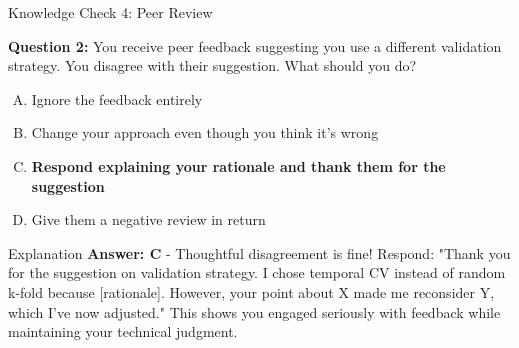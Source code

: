 \begin{frame}{Knowledge Check 4: Peer Review}
\vspace{0.2cm}

\textbf{Question 2:} You receive peer feedback suggesting you use a different validation strategy. You disagree with their suggestion. What should you do?

\begin{enumerate}[A)]
\item Ignore the feedback entirely
\item Change your approach even though you think it's wrong
\item \textcolor{forest}{\textbf{Respond explaining your rationale and thank them for the suggestion}}
\item Give them a negative review in return
\end{enumerate}

\pause

\begin{block}{Explanation}
\textcolor{forest}{\textbf{Answer: C}} - Thoughtful disagreement is fine! Respond: "Thank you for the suggestion on validation strategy. I chose temporal CV instead of random k-fold because [rationale]. However, your point about X made me reconsider Y, which I've now adjusted." This shows you engaged seriously with feedback while maintaining your technical judgment.
\end{block}
\end{frame}

